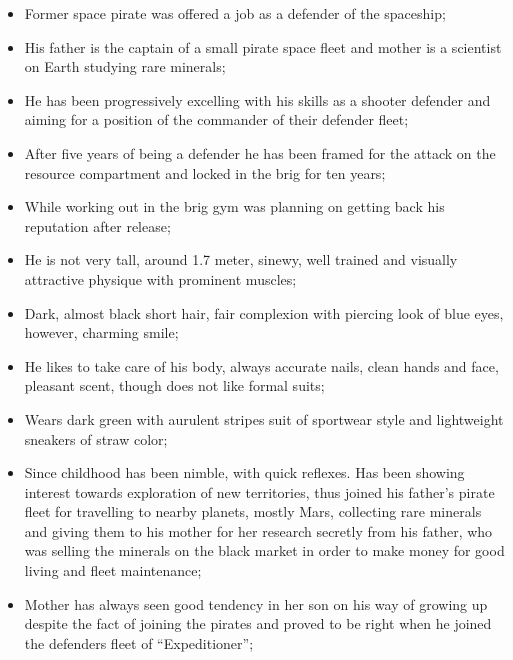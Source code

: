 \documentclass{article}
\begin{document}
\begin{itemize}

  \item Former space pirate was offered a job as a defender of the spaceship;

  \item His father is the captain of a small pirate space fleet and mother is a
    scientist on Earth studying rare minerals;

  \item He has been progressively excelling with his skills as a shooter
    defender and aiming for a position of the commander of their defender fleet;

  \item After five years of being a defender he has been framed for the attack
    on the resource compartment and locked in the brig for ten years;

  \item While working out in the brig gym was planning on getting back his
    reputation after release;

  \item He is not very tall, around 1.7 meter, sinewy, well trained and visually
    attractive physique with prominent muscles;

  \item Dark, almost black short hair, fair complexion with piercing look of
    blue eyes, however, charming smile;

  \item He likes to take care of his body, always accurate nails, clean hands
    and face, pleasant scent, though does not like formal suits;

  \item Wears dark green with aurulent stripes suit of sportwear style and
    lightweight sneakers of straw color;

  \item Since childhood has been nimble, with quick reflexes. Has been showing
    interest towards exploration of new territories, thus joined his father's
    pirate fleet for travelling to nearby planets, mostly Mars, collecting rare
    minerals and giving them to his mother for her research secretly from his
    father, who was selling the minerals on the black market in order to make
    money for good living and fleet maintenance;

  \item Mother has always seen good tendency in her son on his way of growing up
    despite the fact of joining the pirates and proved to be right when he joined
    the defenders fleet of ``Expeditioner'';

\end{itemize}
\end{document}
